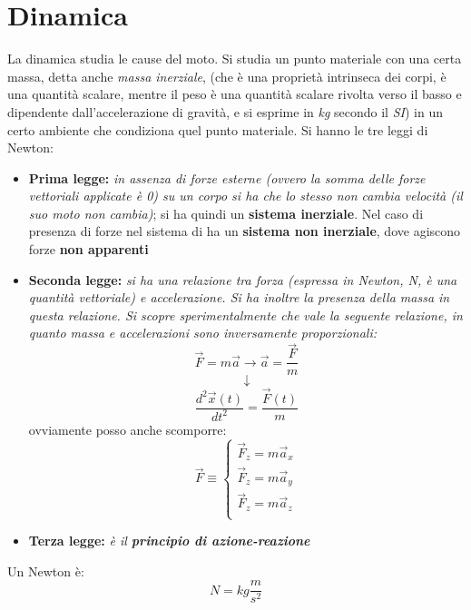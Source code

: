 \documentclass[a4paper,12pt, oneside]{book}
\begin{document}

\newpage
\section{Dinamica}
La dinamica studia le cause del moto. Si studia un punto materiale con una certa massa, detta anche \textit{massa inerziale}, (che è una proprietà intrinseca dei corpi, è una quantità scalare, mentre il peso è una quantità scalare rivolta verso il basso e dipendente dall'accelerazione di gravità, e si esprime in \textit{kg} secondo il \textit{SI}) in un certo ambiente che condiziona quel punto materiale. Si hanno le tre leggi di Newton:
\begin{itemize}
\item \textbf{Prima legge:} \textit{in assenza di forze esterne (ovvero la somma delle forze vettoriali applicate è 0) su un corpo si ha che lo stesso non cambia velocità (il suo moto non cambia)}; si ha quindi un \textbf{sistema inerziale}. Nel caso di presenza di forze nel sistema di ha un \textbf{sistema non inerziale}, dove agiscono forze \textbf{non apparenti}
\item \textbf{Seconda legge:} \textit{si ha una relazione tra forza (espressa in Newton, N, è una quantità vettoriale) e accelerazione. Si ha inoltre la presenza della massa in questa relazione. Si scopre sperimentalmente che vale la seguente relazione, in quanto massa e accelerazioni sono inversamente proporzionali:}
$$\vec{F}=m\vec{a}\to \vec{a}=\frac{\vec{F}}{m}$$
$$\downarrow$$
$$\frac{d^2\vec{x}(t)}{dt^2}=\frac{\vec{F}(t)}{m}$$
ovviamente posso anche scomporre:
$$\vec{F}\equiv
\begin{cases}
\vec{F}_z=m\vec{a}_x\\
\vec{F}_z=m\vec{a}_y\\
\vec{F}_z=m\vec{a}_z\\
\end{cases}$$
\item \textbf{Terza legge:} \textit{è il \textbf{principio di azione-reazione}}
\end{itemize}
Un Newton è: 
$$N=kg\frac{m}{s^2}$$
\newpage
\end{document}
